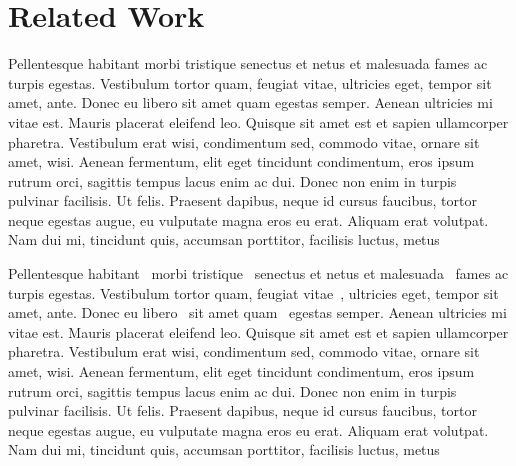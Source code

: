 
\chapter{Related Work}\label{sec:related}
Pellentesque habitant morbi tristique senectus et netus et malesuada fames ac turpis egestas. Vestibulum tortor quam, feugiat vitae, ultricies eget, tempor sit amet, ante. Donec eu libero sit amet quam egestas semper. Aenean ultricies mi vitae est. Mauris placerat eleifend leo. Quisque sit amet est et sapien ullamcorper pharetra. Vestibulum erat wisi, condimentum sed, commodo vitae, ornare sit amet, wisi. Aenean fermentum, elit eget tincidunt condimentum, eros ipsum rutrum orci, sagittis tempus lacus enim ac dui. Donec non enim in turpis pulvinar facilisis. Ut felis. Praesent dapibus, neque id cursus faucibus, tortor neque egestas augue, eu vulputate magna eros eu erat. Aliquam erat volutpat. Nam dui mi, tincidunt quis, accumsan porttitor, facilisis luctus, metus

Pellentesque habitant~\cite{8094140, 7157818, 8416424, 8406200} morbi tristique~\cite{8094140} senectus et netus et malesuada~\cite{7157818} fames ac turpis egestas. Vestibulum\cite{181294} tortor quam, feugiat vitae~\cite{8416424}, ultricies eget\cite{8406200}, tempor sit amet, ante\cite{Chen-ASD}. Donec eu libero~\cite{7876241,181294} sit amet quam~\cite{7876241} egestas semper. Aenean\cite{7979979} ultricies mi vitae est. Mauris placerat eleifend leo. Quisque\cite{7899588} sit amet est et sapien ullamcorper\cite{Mu-AAAS} pharetra. Vestibulum erat wisi, condimentum sed\cite{7899588}, commodo vitae, ornare sit amet, wisi. Aenean fermentum, elit eget tincidunt condimentum, eros ipsum rutrum orci, sagittis tempus lacus enim ac dui. Donec non enim in turpis pulvinar facilisis. Ut felis. Praesent dapibus, neque id cursus faucibus, tortor neque egestas augue, eu vulputate magna eros eu erat. Aliquam erat volutpat. Nam dui mi, tincidunt quis, accumsan porttitor, facilisis luctus, metus

